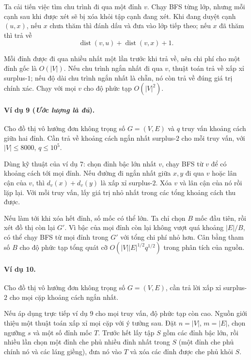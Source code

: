 \documentclass[11pt]{article}
\begin{document}
Ta cải tiến việc tìm chu trình đi qua một đỉnh $v$. Chạy BFS từng lớp, nhưng
mỗi cạnh sau khi được xét sẽ bị xóa khỏi tập cạnh đang xét. Khi đang duyệt cạnh
$(u,x)$, nếu $x$ chưa thăm thì đánh dấu và đưa vào lớp tiếp theo; nếu $x$ đã
thăm thì trả về
\[
  \operatorname{dist}(v,u)+\operatorname{dist}(v,x)+1.
\]

Mỗi đỉnh được đi qua nhiều nhất một lần trước khi trả về, nên chi phí cho một
đỉnh gốc là $O(|V|)$. Nếu chu trình ngắn nhất đi qua $v$, thuật toán trả về
xấp xỉ surplus-$1$; nếu độ dài chu trình ngắn nhất là chẵn, nó còn trả về đúng
giá trị chính xác. Chạy với mọi $v$ cho độ phức tạp $O(|V|^2)$.

\paragraph{Ví dụ 9 (\emph{Ước lượng là đủ}).}
Cho đồ thị vô hướng đơn không trọng số $G=(V,E)$ và $q$ truy vấn khoảng cách
giữa hai đỉnh. Cần trả về khoảng cách ngắn nhất surplus-$2$ cho mỗi truy vấn,
với $|V|\le8000$, $q\le10^5$.

Dùng kỹ thuật của ví dụ 7: chọn đỉnh bậc lớn nhất $v$, chạy BFS từ $v$ để có
khoảng cách tới mọi đỉnh. Nếu đường đi ngắn nhất giữa $x,y$ đi qua $v$ hoặc
lân cận của $v$, thì $d_v(x)+d_v(y)$ là xấp xỉ surplus-$2$. Xóa $v$ và lân cận
của nó rồi lặp lại. Với mỗi truy vấn, lấy giá trị nhỏ nhất trong các tổng
khoảng cách thu được.

Nếu làm tới khi xóa hết đỉnh, số mốc có thể lớn. Ta chỉ chọn $B$ mốc đầu tiên,
rồi xét đồ thị còn lại $G'$. Vì bậc của mọi đỉnh còn lại không vượt quá khoảng
$|E|/B$, có thể chạy BFS từ mọi đỉnh trong $G'$ với tổng chi phí nhỏ hơn. Cân
bằng tham số $B$ cho độ phức tạp tổng quát cỡ
$O(|V||E|^{1/2}q^{1/2})$ trong phân tích của nguồn.

\paragraph{Ví dụ 10.}
Cho đồ thị vô hướng đơn không trọng số $G=(V,E)$, cần trả lời xấp xỉ
surplus-$2$ cho mọi cặp khoảng cách ngắn nhất.

Nếu áp dụng trực tiếp ví dụ 9 cho mọi truy vấn, độ phức tạp còn cao. Nguồn
giới thiệu một thuật toán xấp xỉ mọi cặp với ý tưởng sau. Đặt
$n=|V|$, $m=|E|$, chọn ngưỡng $s$ và một số đỉnh mốc $T$. Trước hết lấy tập
$S$ gồm các đỉnh bậc lớn, rồi nhiều lần chọn một đỉnh che phủ nhiều đỉnh nhất
trong $S$ (một đỉnh che phủ chính nó và các láng giềng), đưa nó vào $T$ và xóa
các đỉnh được che phủ khỏi $S$.
\end{document}
